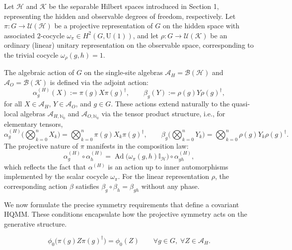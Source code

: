\documentclass[12pt,a4paper]{article}
\begin{document}
Let \(\mathcal{H}\) and \(\mathcal{K}\) be the separable Hilbert spaces introduced in Section 1, representing the hidden and observable degrees of freedom, respectively. Let \(\pi: G \to \mathcal{U}(\mathcal{H})\) be a projective representation of \(G\) on the hidden space with associated \(2\)-cocycle \(\omega_\pi \in H^2(G, \mathrm{U}(1))\), and let \(\rho: G \to \mathcal{U}(\mathcal{K})\) be an ordinary (linear) unitary representation on the observable space, corresponding to the trivial cocycle \(\omega_\rho(g,h) = 1\).

The algebraic action of \(G\) on the single-site algebras \(\mathcal{A}_H = \mathcal{B}(\mathcal{H})\) and \(\mathcal{A}_O = \mathcal{B}(\mathcal{K})\) is defined via the adjoint action:
\begin{equation}
\alpha_g^{(H)}(X) := \pi(g) X \pi(g)^\dagger, \qquad \beta_g(Y) := \rho(g) Y \rho(g)^\dagger,
\label{eq:adjoint_actions}
\end{equation}
for all \(X \in \mathcal{A}_H\), \(Y \in \mathcal{A}_O\), and \(g \in G\). These actions extend naturally to the quasi-local algebras \(\mathcal{A}_{H,\mathbb{N}_0}\) and \(\mathcal{A}_{O,\mathbb{N}_0}\) via the tensor product structure, i.e., for elementary tensors,
\begin{equation}
\alpha_g^{(H)}\Big(\bigotimes_{k=0}^n X_k\Big) = \bigotimes_{k=0}^n \pi(g) X_k \pi(g)^\dagger, \qquad
\beta_g\Big(\bigotimes_{k=0}^n Y_k\Big) = \bigotimes_{k=0}^n \rho(g) Y_k \rho(g)^\dagger.
\label{eq:tensor_actions}
\end{equation}
The projective nature of \(\pi\) manifests in the composition law:
\begin{equation}
\alpha_g^{(H)} \circ \alpha_h^{(H)} = \operatorname{Ad}\bigl(\omega_\pi(g,h) \mathbb{I}_{\mathcal{H}}\bigr) \circ \alpha_{gh}^{(H)},
\label{eq:proj_composition}
\end{equation}
which reflects the fact that \(\alpha^{(H)}\) is an action up to inner automorphisms implemented by the scalar cocycle \(\omega_\pi\). For the linear representation \(\rho\), the corresponding action \(\beta\) satisfies \(\beta_g \circ \beta_h = \beta_{gh}\) without any phase.

We now formulate the precise symmetry requirements that define a covariant HQMM. These conditions encapsulate how the projective symmetry acts on the generative structure.

\begin{equation}
\phi_0\bigl( \pi(g) Z \pi(g)^\dagger \bigr) = \phi_0(Z) \qquad \forall g \in G,\; \forall Z \in \mathcal{A}_H.
\label{eq:initial_invariance}
\end{equation}
\end{document}
